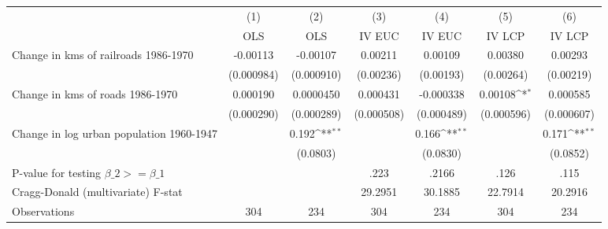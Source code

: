 {
\def\sym#1{\ifmmode^{#1}\else\(^{#1}\)\fi}
\begin{tabular}{l*{6}{c}}
\hline\hline
                &\multicolumn{1}{c}{(1)}&\multicolumn{1}{c}{(2)}&\multicolumn{1}{c}{(3)}&\multicolumn{1}{c}{(4)}&\multicolumn{1}{c}{(5)}&\multicolumn{1}{c}{(6)}\\
                &\multicolumn{1}{c}{OLS}&\multicolumn{1}{c}{OLS}&\multicolumn{1}{c}{IV EUC}&\multicolumn{1}{c}{IV EUC}&\multicolumn{1}{c}{IV LCP}&\multicolumn{1}{c}{IV LCP}\\
\hline
Change in kms of railroads 1986-1970& -0.00113         & -0.00107         &  0.00211         &  0.00109         &  0.00380         &  0.00293         \\
                &(0.000984)         &(0.000910)         &(0.00236)         &(0.00193)         &(0.00264)         &(0.00219)         \\
[1em]
Change in kms of roads 1986-1970& 0.000190         &0.0000450         & 0.000431         &-0.000338         &  0.00108\sym{*}  & 0.000585         \\
                &(0.000290)         &(0.000289)         &(0.000508)         &(0.000489)         &(0.000596)         &(0.000607)         \\
[1em]
Change in log urban population 1960-1947&                  &    0.192\sym{**} &                  &    0.166\sym{**} &                  &    0.171\sym{**} \\
                &                  & (0.0803)         &                  & (0.0830)         &                  & (0.0852)         \\
\hline
P-value for testing $\beta\_{2} >= \beta\_{1}$&                  &                  &     .223         &    .2166         &     .126         &     .115         \\
Cragg-Donald (multivariate) F-stat&                  &                  &  29.2951         &  30.1885         &  22.7914         &  20.2916         \\
Observations    &      304         &      234         &      304         &      234         &      304         &      234         \\
\hline\hline
\end{tabular}
}
